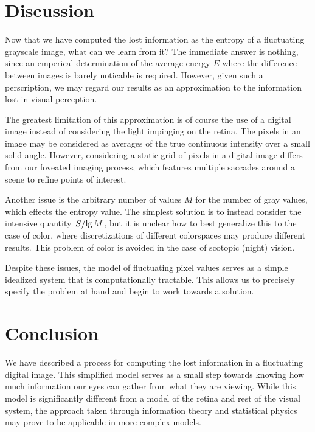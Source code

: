 \documentclass[aps,reprint]{revtex4-2}
\renewcommand\mathrm\textnormal%
\theoremstyle{plain}
\theoremstyle{definition}
\renewcommand\lg{\operatorname{\mathrm{lg}}}
\begin{document}
\section{Discussion}

Now that we have computed the lost information as the entropy of a fluctuating
grayscale image, what can we learn from it? The immediate answer is nothing,
since an emperical determination of the average energy $E$ where the difference
between images is barely noticable is required. However, given such a
perscription, we may regard our results as an approximation to the information
lost in visual perception.

The greatest limitation of this approximation is of course the use of a digital
image instead of considering the light impinging on the retina. The pixels in an
image may be considered as averages of the true continuous intensity over a
small solid angle. However, considering a static grid of pixels in a digital
image differs from our foveated imaging process, which features multiple
saccades around a scene to refine points of interest.

Another issue is the arbitrary number of values $M$ for the number of gray
values, which effects the entropy value. The simplest solution is to instead
consider the intensive quantity $\flatfrac{S}{\lg M}$, but it is unclear how to
best generalize this to the case of color, where discretizations of different
colorspaces may produce different results. This problem of color is avoided in
the case of scotopic (night) vision.

Despite these issues, the model of fluctuating pixel values serves as a simple
idealized system that is computationally tractable. This allows us to precisely
specify the problem at hand and begin to work towards a solution.

\section{Conclusion}

We have described a process for computing the lost information in a fluctuating
digital image. This simplified model serves as a small step towards knowing how
much information our eyes can gather from what they are viewing. While this
model is significantly different from a model of the retina and rest of the
visual system, the approach taken through information theory and statistical
physics may prove to be applicable in more complex models.
\end{document}
